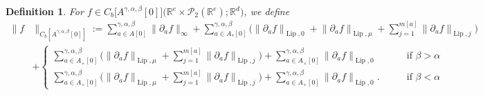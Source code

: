 \documentclass[a4paper,11pt,twoside]{article}
\numberwithin{equation}{section}
\theoremstyle{plain}
\newtheorem{definition}[theorem]{Definition}
\newcommand{\bR}{\mathbb{R}}
\newcommand{\cP}{\mathcal{P}}
\DeclareMathOperator{\lip}{Lip}
\newcommand{\1}{\mathbbm{1}}
\begin{document}
\begin{definition}
		For $f\in C_b\big[ A^{\gamma, \alpha, \beta}[0] \big]\big(\bR^e \times \cP_2(\bR^e); \bR^d\big)$, we define
		\begin{align}
			\nonumber
			\big\| f &\big\|_{C_b[A^{\gamma, \alpha, \beta}[0]]} 
			:= 
			\sum_{ a\in A[0]}^{\gamma, \alpha, \beta} \big\| \partial_a f \big\|_\infty 
			+ 
			\sum_{a\in A_{\ast}[0]}^{\gamma, \alpha, \beta} \bigg( \big\| \partial_a f \big\|_{\lip, 0} + \big\| \partial_a f \big\|_{\lip, \mu} + \sum_{j=1}^{m[a]} \big\| \partial_a f \big\|_{\lip, j} \bigg)
			\\
			\label{eq:definition:FunctionNorm}
			&+
			\left\{ 
			\begin{aligned}
				\sum_{a\in A_{+}[0]}^{\gamma, \alpha, \beta} \bigg( \big\| \partial_a f \big\|_{\lip, \mu} + \sum_{j=1}^{m[a]} \big\| \partial_a f \big\|_{\lip, j} \bigg) + \sum_{a\in A_{\times}[0]}^{\gamma, \alpha, \beta} \big\| \partial_a f \big\|_{\lip, 0} 
				\quad & \quad 
				\mbox{if $\beta>\alpha$}
				\\
				\sum_{a\in A_{\times}[0]}^{\gamma, \alpha, \beta} \bigg( \big\| \partial_a f \big\|_{\lip, \mu} + \sum_{j=1}^{m[a]} \big\| \partial_a f \big\|_{\lip, j} \bigg) + \sum_{a\in A_{+}[0]}^{\gamma, \alpha, \beta} \big\| \partial_a f \big\|_{\lip, 0}. 
				\quad &\quad 
				\mbox{if $\beta<\alpha$}
			\end{aligned}
			\right.
		\end{align}
	\end{definition}
	
\end{document}

